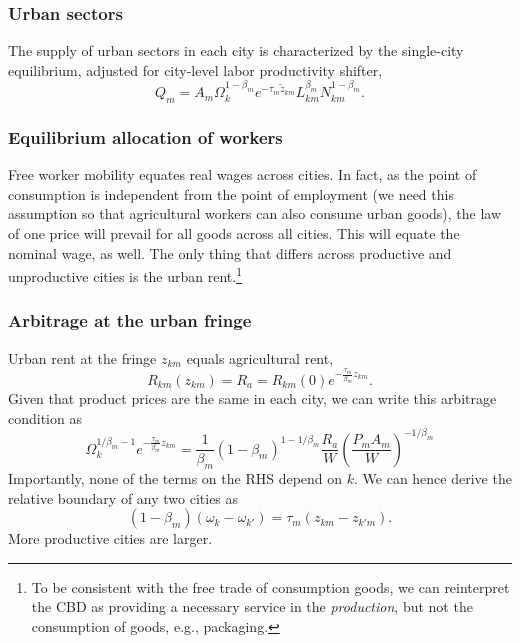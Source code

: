 \documentclass[12pt]{article}
\begin{document}
\subsubsection{Urban sectors}
The supply of urban sectors in each city is characterized by the single-city equilibrium, adjusted for city-level labor productivity shifter,
\[
Q_m = A_m\Omega_k^{1-\beta_m}e^{-\tau_m\tilde z_{km}} 
L_{km}^{\beta_m}
N_{km}^{1-\beta_m}.
\]
\subsubsection{Equilibrium allocation of workers}
Free worker mobility equates real wages across cities. In fact, as the point of consumption is independent from the point of employment (we need this assumption so that agricultural workers can also consume urban goods), the law of one price will prevail for all goods across all cities. This will equate the nominal wage, as well. The only thing that differs across productive and unproductive cities is the urban rent.\footnote{To be consistent with the free trade of consumption goods, we can reinterpret the CBD as providing a necessary service in the \emph{production}, but not the consumption of goods, e.g., packaging.}

\subsubsection{Arbitrage at the urban fringe}
Urban rent at the fringe $z_{km}$ equals agricultural rent,
\[
R_{km}(z_{km}) = R_a = R_{km}(0)e^{-\frac{\tau_m}{\beta_m}z_{km}}.
\]
Given that product prices are the same in each city, we can write this arbitrage condition as
\[
\Omega_k^{1/\beta_m-1}e^{-\frac{\tau_m}{\beta_m}z_{km}}
=\frac1{\beta_m}
(1-\beta_m)^{1-1/\beta_m}
\frac{R_a}{W}
\left(
\frac{P_mA_m}{W}
\right)^{-1/\beta_m}
\]
Importantly, none of the terms on the RHS depend on $k$. We can hence derive the relative boundary of any two cities as
\[
(1-\beta_m)(\omega_{k} - \omega_{k'}) = 
\tau_m(z_{km} - z_{k'm}).
\]
More productive cities are larger.
\end{document}
